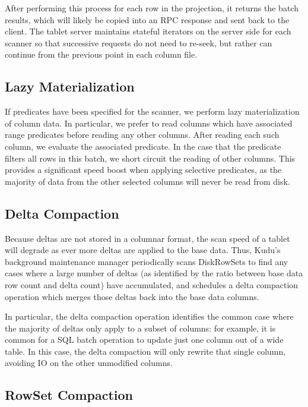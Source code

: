 \documentclass{vldb}
\begin{document}
After performing this process for each row in the projection, it returns the batch results,
which will likely be copied into an RPC response and sent back to the client. The tablet
server maintains stateful iterators on the server side for each scanner so that successive
requests do not need to re-seek, but rather can continue from the previous point in each column file.

\subsection{Lazy Materialization}

If predicates have been specified for the scanner, we perform lazy
materialization\cite{abadi} of column data. In particular, we prefer
to read columns which have associated range predicates before reading any other
columns. After reading each such column, we evaluate the associated predicate.
In the case that the predicate filters all rows in this batch, we short circuit
the reading of other columns. This provides a significant speed boost when applying
selective predicates, as the majority of data from the other selected columns
will never be read from disk.

\subsection{Delta Compaction}

Because deltas are not stored in a columnar format, the scan speed of a tablet will
degrade as ever more deltas are applied to the base data. Thus, Kudu's background
maintenance manager periodically scans DiskRowSets to find any cases where a large number
of deltas (as identified by the ratio between base data row count and delta count) have accumulated,
and schedules a delta compaction operation which merges those
deltas back into the base data columns.

In particular, the delta compaction operation identifies the common case where the
majority of deltas only apply to a subset of columns: for example, it is common for a SQL
batch operation to update just one column out of a wide table.  In this case, the delta
compaction will only rewrite that single column, avoiding IO on the other unmodified columns.

\subsection{RowSet Compaction}
\label{sec:rowset_compaction}
\end{document}
